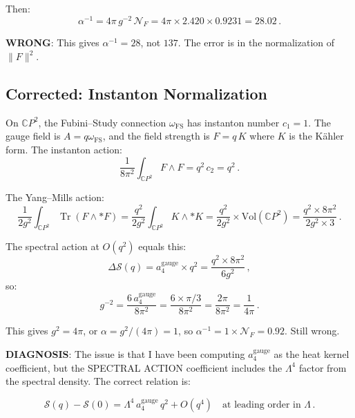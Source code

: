 \documentclass[11pt,a4paper]{article}
\newcommand{\Tr}{\operatorname{Tr}}
\newcommand{\CP}{\mathbb{C}P}
\begin{document}
Then:
\begin{equation}
\alpha^{-1} = 4\pi\,g^{-2}\,\mathcal{N}_F = 4\pi \times 2.420 \times 0.9231 = 28.02\,.
\end{equation}

\textbf{WRONG}: This gives $\alpha^{-1} = 28$, not $137$. The error is in the normalization of $\|F\|^2$.

\subsection{Corrected: Instanton Normalization}

On $\CP^2$, the Fubini--Study connection $\omega_{\mathrm{FS}}$ has instanton number $c_1 = 1$. The gauge field is $A = q\omega_{\mathrm{FS}}$, and the field strength is $F = q\,K$ where $K$ is the K\"ahler form. The instanton action:
\begin{equation}
\frac{1}{8\pi^2}\int_{\CP^2} F \wedge F = q^2\,c_2 = q^2\,.
\end{equation}

The Yang--Mills action:
\begin{equation}
\frac{1}{2g^2}\int_{\CP^2}\Tr(F \wedge *F) = \frac{q^2}{2g^2}\int_{\CP^2} K \wedge *K = \frac{q^2}{2g^2}\times\mathrm{Vol}(\CP^2) = \frac{q^2\times 8\pi^2}{2g^2\times 3}\,.
\end{equation}

The spectral action at $O(q^2)$ equals this:
\begin{equation}
\Delta\mathcal{S}(q) = a_4^{\mathrm{gauge}}\times q^2 = \frac{q^2\times 8\pi^2}{6g^2}\,,
\end{equation}
so:
\begin{equation}
g^{-2} = \frac{6\,a_4^{\mathrm{gauge}}}{8\pi^2} = \frac{6\times\pi/3}{8\pi^2} = \frac{2\pi}{8\pi^2} = \frac{1}{4\pi}\,.
\end{equation}

This gives $g^2 = 4\pi$, or $\alpha = g^2/(4\pi) = 1$, so $\alpha^{-1} = 1\times\mathcal{N}_F = 0.92$. Still wrong.

\textbf{DIAGNOSIS}: The issue is that I have been computing $a_4^{\mathrm{gauge}}$ as the heat kernel coefficient, but the SPECTRAL ACTION coefficient includes the $\Lambda^4$ factor from the spectral density. The correct relation is:

\begin{equation}
\mathcal{S}(q) - \mathcal{S}(0) = \Lambda^4\,a_4^{\mathrm{gauge}}\,q^2 + O(q^4)\quad\text{at leading order in }\Lambda\,.
\end{equation}
\end{document}
